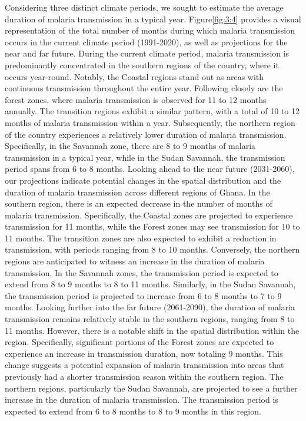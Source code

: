\documentclass[utf8]{FrontiersinHarvard} %
\begin{document}
Considering three distinct climate periods, we sought to estimate the average duration of malaria transmission in a typical year. Figure\ref{fig:3:4} provides a visual representation of the total number of months during which malaria transmission occurs in the current climate period (1991-2020), as well as projections for the near and far future. During the current climate period, malaria transmission is predominantly concentrated in the southern regions of the country, where it occurs year-round. Notably, the Coastal regions stand out as areas with continuous transmission throughout the entire year. Following closely are the forest zones, where malaria transmission is observed for 11 to 12 months annually. The transition regions exhibit a similar pattern, with a total of 10 to 12 months of malaria transmission within a year. Subsequently, the northern region of the country experiences a relatively lower duration of malaria transmission. Specifically, in the Savannah zone, there are 8 to 9 months of malaria transmission in a typical year, while in the Sudan Savannah, the transmission period spans from 6 to 8 months. 
Looking ahead to the near future (2031-2060), our projections indicate potential changes in the spatial distribution and the duration of malaria transmission across different regions of Ghana. In the southern region, there is an expected decrease in the number of months of malaria transmission. Specifically, the Coastal zones are projected to experience transmission for 11 months, while the Forest zones may see transmission for 10 to 11 months. The transition zones are also expected to exhibit a reduction in transmission, with periods ranging from 8 to 10 months. Conversely, the northern regions are anticipated to witness an increase in the duration of malaria transmission. In the Savannah zones, the transmission period is expected to extend from 8 to 9 months to 8 to 11 months. Similarly, in the Sudan Savannah, the transmission period is projected to increase from 6 to 8 months to 7 to 9 months. 
Looking further into the far future (2061-2090), the duration of malaria transmission remains relatively stable in the southern regions, ranging from 8 to 11 months. However, there is a notable shift in the spatial distribution within the region. Specifically, significant portions of the Forest zones are expected to experience an increase in transmission duration, now totaling 9 months. This change suggests a potential expansion of malaria transmission into areas that previously had a shorter transmission season within the southern region. The northern regions, particularly the Sudan Savannah, are projected to see a further increase in the duration of malaria transmission. The transmission period is expected to extend from 6 to 8 months to 8 to 9 months in this region. 
\end{document}
